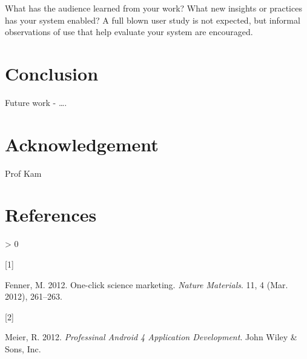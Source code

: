 \documentclass{acm_proc_article-sp}
\newlength{\csllabelwidth}
\newlength{\cslhangindent}
\newenvironment{CSLReferences}[3] %
 {%
  \setlength{\parindent}{0pt}
  \ifodd #1 \everypar{\setlength{\hangindent}{\cslhangindent}}\ignorespaces\fi
  \ifnum #2 > 0
  \setlength{\parskip}{#2\baselineskip}
  \fi
 }%
 {}
\newcommand{\CSLLeftMargin}[1]{\parbox[t]{\csllabelwidth}{#1}}
\newcommand{\CSLRightInline}[1]{\parbox[t]{\linewidth - \csllabelwidth}{#1}}
\begin{document}
What has the audience learned from your work? What new insights or
practices has your system enabled? A full blown user study is not
expected, but informal observations of use that help evaluate your
system are encouraged.

\hypertarget{conclusion}{%
\section{Conclusion}\label{conclusion}}

Future work - \ldots.

\hypertarget{acknowledgement}{%
\section{Acknowledgement}\label{acknowledgement}}

Prof Kam

\hypertarget{references}{%
\section*{References}\label{references}}

\hypertarget{refs}{}
\begin{CSLReferences}{0}{0}
\leavevmode\hypertarget{ref-fenner2012a}{}%
\CSLLeftMargin{{[}1{]} }
\CSLRightInline{Fenner, M. 2012. One-click science marketing.
\emph{Nature Materials}. 11, 4 (Mar. 2012), 261--263.}

\leavevmode\hypertarget{ref-meier2012}{}%
\CSLLeftMargin{{[}2{]} }
\CSLRightInline{Meier, R. 2012. \emph{Professinal Android 4 Application
Development}. John Wiley \& Sons, Inc.}

\end{CSLReferences}
\setlength{\parindent}{0in}
\end{document}
